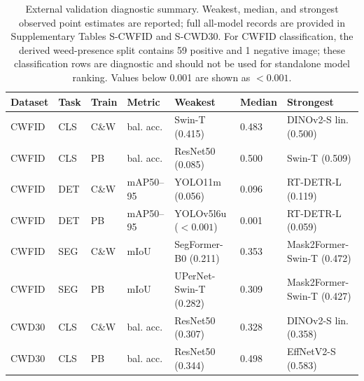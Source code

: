 \begin{table}[!htbp]
\centering
\footnotesize
\setlength{\tabcolsep}{3pt}
\renewcommand{\arraystretch}{1.14}
\caption{External validation diagnostic summary. Weakest, median, and strongest observed point estimates are reported; full all-model records are provided in Supplementary Tables S-CWFID and S-CWD30. For CWFID classification, the derived weed-presence split contains 59 positive and 1 negative image; these classification rows are diagnostic and should not be used for standalone model ranking. Values below 0.001 are shown as $<0.001$.}
\label{tab:external}
\begin{tabularx}{\textwidth}{@{}C{0.075\textwidth}C{0.052\textwidth}C{0.052\textwidth}C{0.105\textwidth}P{0.245\textwidth}C{0.082\textwidth}X@{}}
\toprule
Dataset & Task & Train & Metric & Weakest & Median & Strongest \\
\midrule
CWFID & CLS & C\&W & bal. acc. & Swin-T (0.415) & 0.483 & DINOv2-S lin. (0.500) \\
CWFID & CLS & PB & bal. acc. & ResNet50 (0.085) & 0.500 & Swin-T (0.509) \\
CWFID & DET & C\&W & mAP50--95 & YOLO11m (0.056) & 0.096 & RT-DETR-L (0.119) \\
CWFID & DET & PB & mAP50--95 & YOLOv5l6u ($<0.001$) & 0.001 & RT-DETR-L (0.059) \\
CWFID & SEG & C\&W & mIoU & SegFormer-B0 (0.211) & 0.353 & Mask2Former-Swin-T (0.472) \\
CWFID & SEG & PB & mIoU & UPerNet-Swin-T (0.282) & 0.309 & Mask2Former-Swin-T (0.427) \\
CWD30 & CLS & C\&W & bal. acc. & ResNet50 (0.307) & 0.328 & DINOv2-S lin. (0.358) \\
CWD30 & CLS & PB & bal. acc. & ResNet50 (0.344) & 0.498 & EffNetV2-S (0.583) \\
\bottomrule
\end{tabularx}
\end{table}

